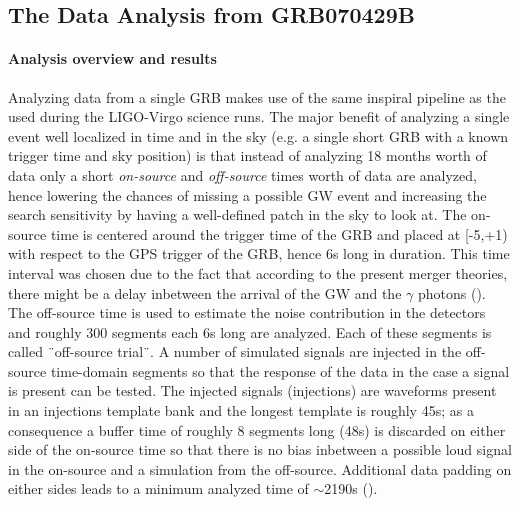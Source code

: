 \documentclass[epsf]{article}
\begin{document}
\subsection{The Data Analysis from GRB070429B}

\paragraph{Analysis overview and results} Analyzing data from a single GRB makes use of the same inspiral pipeline as the used during the LIGO-Virgo science runs. The major benefit of analyzing a single event well localized in time and in the sky (e.g. a single short GRB with a known trigger time and sky position) is that instead of analyzing 18 months worth of data only a short {\it on-source} and {\it off-source} times worth of data are analyzed, hence lowering the chances of missing a possible GW event and increasing the search sensitivity by having a well-defined patch in the sky to look at. The on-source time is centered around the trigger time of the GRB and placed at [-5,+1) with respect to the GPS trigger of the GRB, hence 6s long in duration. This time interval was chosen due to the fact that according to the present merger theories, there might be a delay inbetween the arrival of the GW and the $\gamma$ photons (\cite{nakar}). The off-source time is used to estimate the noise contribution in the detectors and roughly 300 segments each 6s long are analyzed. Each of these segments is called ¨off-source trial¨. A number of simulated signals are injected in the off-source time-domain segments so that the response of the data in the case a signal is present can be tested. The injected signals (injections) are waveforms present in an injections template bank and the longest template is roughly 45s; as a consequence a buffer time of roughly 8 segments long (48s) is discarded on either side of the on-source time so that there is no bias inbetween a possible loud signal in the on-source and a simulation from the off-source. Additional data padding on either sides leads to a minimum analyzed time of $\sim$2190s (\cite{grb}).
\end{document}
